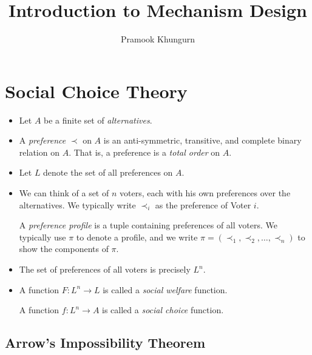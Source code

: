 \documentclass[10pt]{article}
\title{Introduction to Mechanism Design}
\author{Pramook Khungurn}
\begin{document}
	\maketitle
	
	\section{Social Choice Theory}
	
		\begin{itemize}
			
			\item Let $A$ be a finite set of \emph{alternatives}. 
			
			\item A \emph{preference} $\prec$ on $A$ is an anti-symmetric, transitive,
			and complete binary relation on $A$. That is, a preference
			is a \emph{total order} on $A.$
			
			\item Let $L$ denote the set of all preferences on $A$.
			
			\item We can think of a set of $n$ voters, each with his own preferences
			over the alternatives. We typically write $\prec_i$ as the preference
			of Voter $i$. 
			
			A \emph{preference profile} is a tuple containing preferences of all voters.
			We typically use $\pi$ to denote a profile, and we write $\pi = (\prec_1, \prec_2, \dotsc, \prec_n)$
			to show the components of $\pi$.
			
			\item The set of preferences of all voters is precisely $L^n.$
			
			\item A function $F: L^n \rightarrow L$ is called a \emph{social welfare} function.
			
			A function $f: L^n \rightarrow A$ is called a \emph{social choice} function.
			
		\end{itemize}
	
	\subsection{Arrow's Impossibility Theorem}
	
\end{document}
